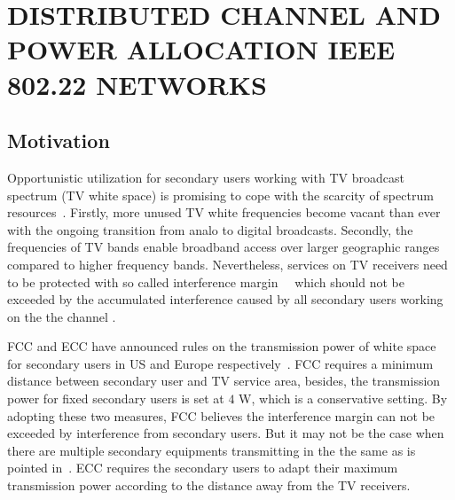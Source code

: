 \chapter{DISTRIBUTED CHANNEL AND POWER ALLOCATION IEEE 802.22 NETWORKS}

\section{Motivation}


Opportunistic utilization for secondary users working with TV broadcast spectrum (TV white space) is promising to cope with the scarcity of spectrum resources~\cite{FCC_2010_sedond_memorandumm}. 
Firstly, more unused TV white frequencies become vacant than ever with the ongoing transition from analo to digital broadcasts. Secondly, the frequencies of TV bands enable broadband access over larger geographic ranges compared to higher frequency bands. Nevertheless, services on TV receivers need to be protected with so called interference margin~~\cite{multipleIntf_pimrc11} which should not be exceeded by the accumulated interference caused by all secondary users working on the the channel .

\gls{FCC} and \gls{ECC} have announced rules on the transmission power of white space for secondary users in US and Europe respectively~\cite{FCC_2010_sedond_memorandumm, ecc159}. 
FCC requires a minimum distance between secondary user and TV service area, besides, the transmission power for fixed secondary users is set at $4$ \textup{W}, which is a conservative setting. %
By adopting these two measures, FCC believes the interference margin can not be exceeded by interference from secondary users.
But it may not be the case when there are multiple secondary equipments transmitting in the the same as is pointed in~\cite{Jaentti11}.
ECC requires the secondary users to adapt their maximum transmission power according to the distance away from the TV receivers.

